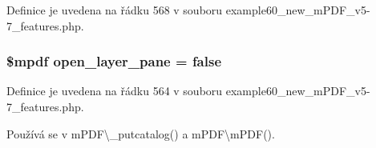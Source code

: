 Definice je uvedena na řádku 568 v souboru example60\-\_\-new\-\_\-m\-P\-D\-F\-\_\-v5-\/7\-\_\-features.\-php.

\hypertarget{example60__new__m_p_d_f__v5-7__features_8php_a3a527a18648151234e1357136e372e18}{
\subsubsection[{open\-\_\-layer\-\_\-pane}]{\setlength{\rightskip}{0pt plus 5cm}\$mpdf open\-\_\-layer\-\_\-pane = {\bf false}}}\label{example60__new__m_p_d_f__v5-7__features_8php_a3a527a18648151234e1357136e372e18}


Definice je uvedena na řádku 564 v souboru example60\-\_\-new\-\_\-m\-P\-D\-F\-\_\-v5-\/7\-\_\-features.\-php.



Používá se v m\-P\-D\-F\textbackslash{}\-\_\-putcatalog() a m\-P\-D\-F\textbackslash{}m\-P\-D\-F().

